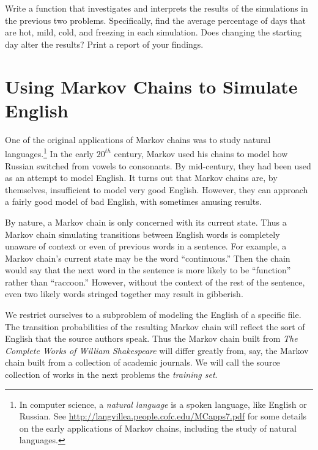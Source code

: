 \begin{problem} %
Write a function that investigates and interprets the results of the simulations in the previous two problems.
Specifically, find the average percentage of days that are hot, mild, cold, and freezing in each simulation.
Does changing the starting day alter the results?
Print a report of your findings.
\end{problem}

\section*{Using Markov Chains to Simulate English} %
One of the original applications of Markov chains was to study natural languages.\footnote{In computer science, a \emph{natural language} is a spoken language, like English or Russian. See \url{http://langvillea.people.cofc.edu/MCapps7.pdf} for some details on the early applications of Markov chains, including the study of natural languages.}
In the early $20^{th}$ century, Markov used his chains to model how Russian switched from vowels to consonants.
By mid-century, they had been used as an attempt to model English.
It turns out that Markov chains are, by themselves, insufficient to model very good English.
However, they can approach a fairly good model of bad English, with sometimes amusing results.

By nature, a Markov chain is only concerned with its current state.
Thus a Markov chain simulating transitions between English words is completely unaware of context or even of previous words in a sentence.
For example, a Markov chain's current state may be the word ``continuous.''
Then the chain would say that the next word in the sentence is more likely to be ``function'' rather than ``raccoon.''
However, without the context of the rest of the sentence, even two likely words stringed together may result in gibberish.

We restrict ourselves to a subproblem of modeling the English of a specific file.
The transition probabilities of the resulting Markov chain will reflect the sort of English that the source authors speak.
Thus the Markov chain built from \emph{The Complete Works of William Shakespeare} will differ greatly from, say, the Markov chain built from a collection of academic journals.
We will call the source collection of works in the next problems the \emph{training set}.

